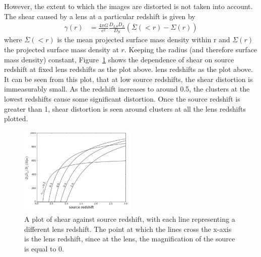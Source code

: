 		However, the extent to which the images are distorted is not taken into account. The shear caused by a lens at a particular redshift is given by
		\begin{align}
			\gamma(r) &= \frac{4\pi G}{c^2}\frac{D_{LS}D_L}{D_S}\left( \overline{\Sigma}(<r)-\Sigma(r) \right)
		\end{align}
		where $\overline{\Sigma}(<r)$ is the mean projected surface mass density within r and $\Sigma(r)$ the projected surface mass density at $r$. Keeping the radius (and therefore surface mass density) constant, Figure~\ref{fig:shear_as_a_function_of_source_redshift} shows the dependence of shear on source redshift at fixed lens redshifts as the plot above. lens redshifts as the plot above. It can be seen from this plot, that at low source redshifts, the shear distortion is immeasurably small. As the redshift increases to around 0.5, the clusters at the lowest redshifts cause some significant distortion. Once the source redshift is greater than 1, shear distortion is seen around clusters at all the lens redshifts plotted\cite{Constraining_source_redshift_distributions}.
		\begin{figure}[!htbp]
			\centering
				\includegraphics[width=0.5\textwidth]{../Images/Shear_as_a_function_of_source_redshift.png}
			\caption[Shear as a function of source redshift]{\cite{Constraining_source_redshift_distributions}A plot of shear against source redshift, with each line representing a different lens redshift. The point at which the lines cross the x-axis is the lens redshift, since at the lens, the magnification of the source is equal to 0.\label{fig:shear_as_a_function_of_source_redshift}}
		\end{figure}


